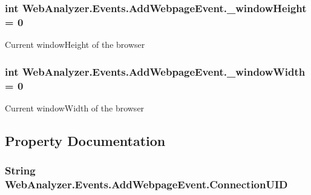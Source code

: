 \subsubsection[{\+\_\+window\+Height}]{\setlength{\rightskip}{0pt plus 5cm}int Web\+Analyzer.\+Events.\+Add\+Webpage\+Event.\+\_\+window\+Height = 0\hspace{0.3cm}{\ttfamily [private]}}\label{class_web_analyzer_1_1_events_1_1_add_webpage_event_ad9982772f07111a104ab6a81d3704bb5}


Current window\+Height of the browser 

\hypertarget{class_web_analyzer_1_1_events_1_1_add_webpage_event_a81172683920ef969d84914baff51a87b}{}
\subsubsection[{\+\_\+window\+Width}]{\setlength{\rightskip}{0pt plus 5cm}int Web\+Analyzer.\+Events.\+Add\+Webpage\+Event.\+\_\+window\+Width = 0\hspace{0.3cm}{\ttfamily [private]}}\label{class_web_analyzer_1_1_events_1_1_add_webpage_event_a81172683920ef969d84914baff51a87b}


Current window\+Width of the browser 



\subsection{Property Documentation}
\hypertarget{class_web_analyzer_1_1_events_1_1_add_webpage_event_a9afa88861712d1088b56b2080cf54b1a}{}
\subsubsection[{Connection\+U\+I\+D}]{\setlength{\rightskip}{0pt plus 5cm}String Web\+Analyzer.\+Events.\+Add\+Webpage\+Event.\+Connection\+U\+I\+D\hspace{0.3cm}{\ttfamily [get]}}\label{class_web_analyzer_1_1_events_1_1_add_webpage_event_a9afa88861712d1088b56b2080cf54b1a}


